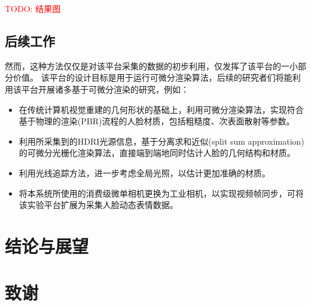 \documentclass{scutmaster}
\newcommand{\TODO}[1]{\textcolor{red}{TODO: #1}}
\begin{document}
\TODO{结果图}

\section{后续工作}

然而，这种方法仅仅是对该平台采集的数据的初步利用，仅发挥了该平台的一小部分价值。
该平台的设计目标是用于运行可微分渲染算法，后续的研究者们将能利用该平台开展诸多基于可微分渲染的研究，例如：
\begin{itemize}
\item 在传统计算机视觉重建的几何形状的基础上，利用可微分渲染算法，实现符合基于物理的渲染(PBR)流程的人脸材质，包括粗糙度、次表面散射等参数。
\item 利用所采集到的HDRI光源信息，基于分离求和近似(split sum approximation)的可微分光栅化渲染算法，直接端到端地同时估计人脸的几何结构和材质。
\item 利用光线追踪方法，进一步考虑全局光照，以估计更加准确的材质。
\item 将本系统所使用的消费级微单相机更换为工业相机，以实现视频帧同步，可将该实验平台扩展为采集人脸动态表情数据。
\end{itemize}

\chapter{结论与展望}
\label{chap:conclusion}

\backmatter


\chapter{致谢}
\end{document}
